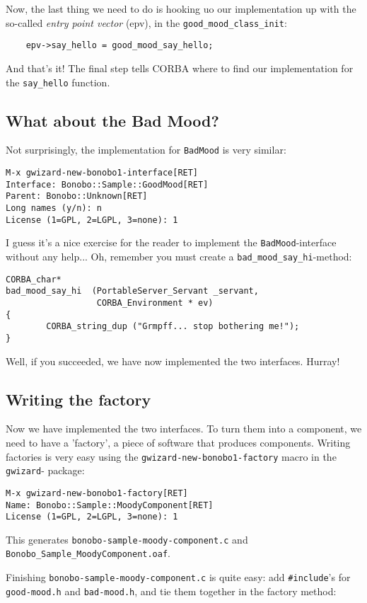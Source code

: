 \documentclass[final,10pt]{article}
\begin{document}
Now, the last thing we need to do is hooking uo our implementation up
with the so-called {\em entry point vector} (epv), in the
\verb|good_mood_class_init|:
\begin{verbatim}
    epv->say_hello = good_mood_say_hello;
\end{verbatim}
And that's it! The final step tells CORBA where to find our
implementation for the \verb|say_hello| function.

\subsection{What about the Bad Mood?}
Not surprisingly, the implementation for \verb|BadMood| is very similar:
\begin{verbatim}
M-x gwizard-new-bonobo1-interface[RET]  
Interface: Bonobo::Sample::GoodMood[RET]
Parent: Bonobo::Unknown[RET]
Long names (y/n): n
License (1=GPL, 2=LGPL, 3=none): 1
\end{verbatim}

I guess it's a nice exercise for the reader to implement the
\verb|BadMood|-interface without any help... Oh, remember you must
create a \verb|bad_mood_say_hi|-method:
\begin{verbatim}
CORBA_char*     
bad_mood_say_hi  (PortableServer_Servant _servant,
                  CORBA_Environment * ev)
{
        CORBA_string_dup ("Grmpff... stop bothering me!");
}
\end{verbatim}
Well, if you succeeded, we have now implemented the two
interfaces. Hurray!

\subsection{Writing the factory}
Now we have implemented the two interfaces. To turn them into a 
component, we need to have a 'factory', a piece of software that
produces components. Writing factories is very easy using the
\verb|gwizard-new-bonobo1-factory| macro in the \verb|gwizard|-
package:
\begin{verbatim}
M-x gwizard-new-bonobo1-factory[RET] 
Name: Bonobo::Sample::MoodyComponent[RET]
License (1=GPL, 2=LGPL, 3=none): 1
\end{verbatim}
This generates \verb|bonobo-sample-moody-component.c| and
\verb|Bonobo_Sample_MoodyComponent.oaf|. 

Finishing \verb|bonobo-sample-moody-component.c| is quite easy:
add \verb|#include|'s for \verb|good-mood.h| and \verb|bad-mood.h|,
and tie them together in the factory method:
\end{document}

